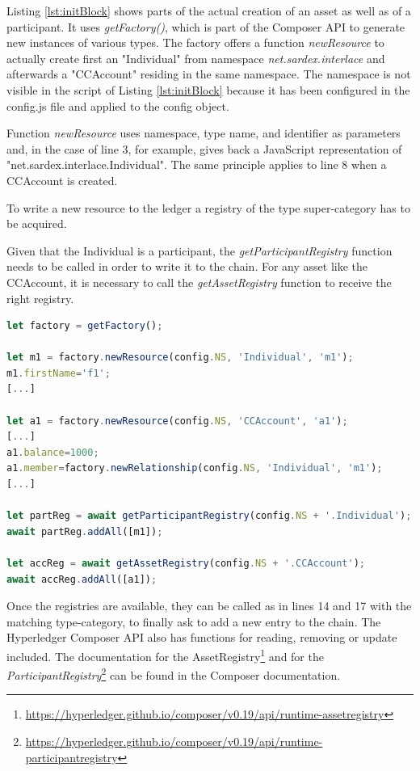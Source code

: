 Listing \ref{lst:initBlock} shows parts of the actual creation of an asset as well as of a participant. It uses \textit{getFactory()}, which is part of the Composer API to generate new instances of various types. The factory offers a function \textit{newResource} to actually create first an "Individual" from namespace \textit{net.sardex.interlace} and afterwards a "CCAccount" residing in the same namespace. The namespace is not visible in the script of Listing \ref{lst:initBlock} because it has been configured in the config.js file and applied to the config object.

Function \textit{newResource} uses namespace, type name, and identifier as parameters and, in the case of line 3, for example, gives back a JavaScript representation of "net.sardex.interlace.Individual". The same principle applies to line 8 when a CCAccount is created.

To write a new resource to the ledger a registry of the type super-category has to be acquired.

Given that the Individual is a participant, the \textit{getParticipantRegistry} function needs to be called in order to write it to the chain. For any asset like the CCAccount, it is necessary to call the \textit{getAssetRegistry} function to receive the right registry.

\begin{center}
\begin{minipage}{0.8\textwidth}
\small
\begin{lstlisting}[language=javascript,firstnumber=1,caption={\bf\small Chaincode adding a new resource in \textit{initBlockchain} function}, captionpos=b,label=lst:initBlock]
let factory = getFactory();

let m1 = factory.newResource(config.NS, 'Individual', 'm1');
m1.firstName='f1';
[...]

let a1 = factory.newResource(config.NS, 'CCAccount', 'a1');
[...]
a1.balance=1000;
a1.member=factory.newRelationship(config.NS, 'Individual', 'm1');
[...]

let partReg = await getParticipantRegistry(config.NS + '.Individual');
await partReg.addAll([m1]);

let accReg = await getAssetRegistry(config.NS + '.CCAccount');
await accReg.addAll([a1]);
\end{lstlisting}
\end{minipage}
\end{center}

Once the registries are available, they can be called as in lines 14 and 17 with the matching type-category, to finally ask to add a new entry to the chain. The Hyperledger Composer API also has  functions for reading, removing or update included. The documentation for the AssetRegistry\footnote{\url{https://hyperledger.github.io/composer/v0.19/api/runtime-assetregistry}} and for the \textit{ParticipantRegistry}\footnote{\url{https://hyperledger.github.io/composer/v0.19/api/runtime-participantregistry}} can be found in the Composer documentation.


